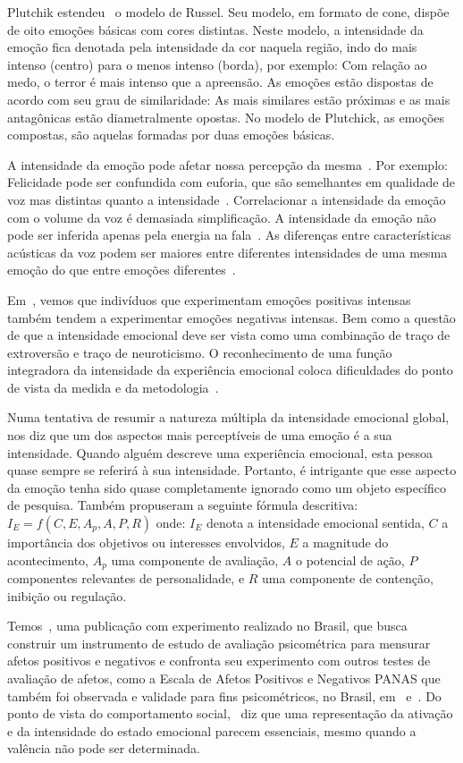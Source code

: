 Plutchik estendeu~\cite{57} o modelo de Russel. Seu modelo, em formato de cone, dispõe de oito emoções básicas com cores distintas. Neste modelo, a intensidade da emoção fica denotada pela intensidade da cor naquela região, indo do mais intenso (centro) para o menos intenso (borda), por exemplo: Com relação ao medo, o terror é mais intenso que a apreensão. As emoções estão dispostas de acordo com seu grau de similaridade: As mais similares estão próximas e as mais antagônicas estão diametralmente opostas. No modelo de Plutchick, as emoções compostas, são aquelas formadas por duas emoções básicas.

A intensidade da emoção pode afetar nossa percepção da mesma~\cite{18.46}. Por exemplo: Felicidade pode ser confundida com euforia, que são semelhantes em qualidade de voz mas distintas quanto a intensidade~\cite{18.9}. Correlacionar a intensidade da emoção com o volume da voz é demasiada simplificação. A intensidade da emoção não pode ser inferida apenas pela energia na fala~\cite{18.12}. As diferenças entre características acústicas da voz podem ser maiores entre diferentes intensidades de uma mesma emoção do que entre emoções diferentes~\cite{18.46}. 

Em~\cite{emoint1}, vemos que indivíduos que experimentam emoções positivas intensas também tendem a experimentar emoções negativas intensas. Bem como a questão de que a intensidade emocional deve ser vista como uma combinação de traço de extroversão e traço de neuroticismo. O reconhecimento de uma função integradora da intensidade da experiência emocional coloca dificuldades do ponto de vista da medida e da metodologia~\cite{emoint2}.

Numa tentativa de resumir a natureza múltipla da intensidade emocional global,~\cite{emoint2.1} nos diz que um dos aspectos mais perceptíveis de uma emoção é a sua intensidade. Quando alguém descreve uma experiência emocional, esta pessoa quase sempre se referirá à sua intensidade. Portanto, é intrigante que esse aspecto da emoção tenha sido quase completamente ignorado como um objeto específico de pesquisa. Também propuseram a seguinte fórmula descritiva: $I_E = f(C, E, A_p, A, P, R)$ onde: $I_E$ denota a intensidade emocional sentida, $C$ a importância dos objetivos ou interesses envolvidos, $E$ a magnitude do acontecimento, $A_p$ uma componente de avaliação, $A$ o potencial de ação, $P$ componentes relevantes de personalidade, e $R$ uma componente de contenção, inibição ou regulação.

Temos~\cite{emoint3}, uma publicação com experimento realizado no Brasil, que busca construir um instrumento de estudo de avaliação psicométrica para mensurar afetos positivos e negativos e confronta seu experimento com outros testes de avaliação de afetos, como a Escala de Afetos Positivos e Negativos \acrshort{PANAS} que também foi observada e validade para fins psicométricos, no Brasil, em~\cite{panas1} e~\cite{panas2}. Do ponto de vista do comportamento social,~\cite{16} diz que uma representação da ativação e da intensidade do estado emocional parecem essenciais, mesmo quando a valência não pode ser determinada.


